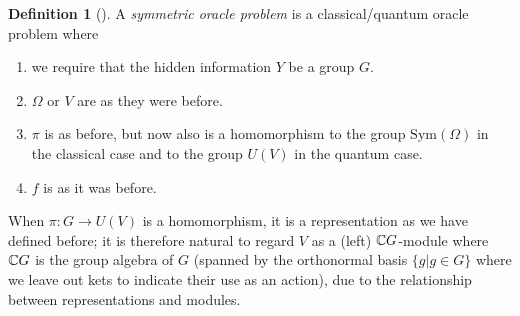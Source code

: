 \documentclass[12pt,twoside]{reedthesis}
\theoremstyle{plain}   %
\theoremstyle{definition}
\newtheorem{defn}{Definition}[section]
\theoremstyle{remark}
\numberwithin{equation}{section}
\def\Sym{\mathrm{Sym}}
\begin{document}
  \begin{defn}[{\cite[Section 2]{copeland}}]
    A \emph{symmetric oracle problem} is a classical/quantum oracle problem where
    \begin{enumerate}
    \item we require that the hidden information $Y$ be a group $G$.
    \item $\Omega$ or $V$ are as they were before.
    \item $\pi$ is as before, but now also is a homomorphism to the group $\Sym(\Omega)$ in the classical case and to the group $U(V)$ in the quantum case.
    \item $f$ is as it was before.
    \end{enumerate}
    When $\pi: G \to U(V)$ is a homomorphism, it is a representation as we have defined before;
    it is therefore natural to regard $V$ as a (left) $\mathbb{C} G$-module where $\mathbb{C} G$ is the group algebra of $G$ (spanned by the orthonormal basis $\{g | g \in G\}$ where we leave out kets to indicate their use as an action),
    due to the relationship between representations and modules.
  \end{defn}
\end{document}
